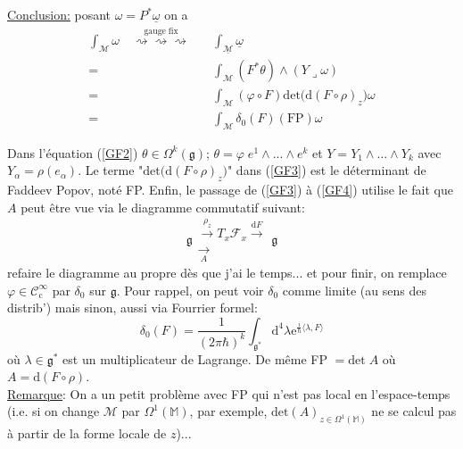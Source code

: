 \documentclass[a4paper,11pt]{article}
\renewcommand{\d}{{\mathrm{d}}}
\newcommand{\e}{{\mathrm{e}}}
\begin{document}
\noindent \underline{Conclusion:} posant $\omega = P^* \underline{\omega}$ on a
\begin{align}
\int_\mathcal{M} \omega \quad \overset{\mathrm{gauge}\;\mathrm{fix}}{\rightsquigarrow\rightsquigarrow\rightsquigarrow}
\quad & \int_{\underline{\mathcal{M}}} \underline{\omega}\\
=& \int_\mathcal{M} (F^* \theta) \wedge (Y\lrcorner \omega)\label{GF2}\\
=& \int_\mathcal{M} (\varphi\circ F) \mathrm{det} \Big( \d (F\circ\rho)_z\Big) \omega\label{GF3}\\
=& \int_\mathcal{M} \delta_0 (F) (\mathrm{FP}) \omega \label{GF4}
\end{align}

Dans l'équation (\ref{GF2}) $\theta \in \Omega^k(\mathfrak{g})$; $\theta=\varphi\; e^1\wedge...\wedge e^k$ et $Y= Y_1 \wedge ... \wedge Y_k$ avec $Y_\alpha = \rho(e_\alpha)$. Le terme "$\mathrm{det} \Big(\d (F\circ\rho)_z\Big)$" dans (\ref{GF3}) est le déterminant de Faddeev Popov, noté FP. Enfin, le passage de (\ref{GF3}) à (\ref{GF4}) utilise le fait que $A$ peut être vue via le diagramme commutatif suivant:
$$\mathfrak{g}
\begin{matrix}
\overset{\rho_z}\to T_x\mathcal{F}_x \overset{\d F} \to \\
\underset A \longrightarrow
\end{matrix}
\mathfrak{g}$$
\color{red} refaire le diagramme au propre dès que j'ai le temps...\color{black} et pour finir, on remplace $\varphi \in \mathcal{C}^\infty_\mathrm{c}$ par $\delta_0$ sur $\mathfrak{g}$. Pour rappel, on peut voir $\delta_0$ comme limite (au sens des distrib') mais sinon, aussi via Fourrier formel:
$$\delta_0(F) = \frac{1}{(2\pi\hbar)^k}\int_{\mathfrak{g}^*} \d^4\lambda \e^{\frac{i}{\hbar}\langle\lambda,F\rangle}$$
où $\lambda \in \mathfrak{g}^*$ est un multiplicateur de Lagrange. De même FP $= \mathrm{det} \; A$ où $A=\d (F\circ \rho)$.\\

\underline{Remarque}: On a un petit problème avec FP qui n'est pas local en l'espace-temps (i.e. si on change $\mathcal M$ par $\Omega^1(\mathbb M)$, par exemple, $\mathrm{det}(A)_{z\in\Omega^1(\mathbb M)}$ ne se calcul pas à partir de la forme locale de $z$)...
\end{document}

